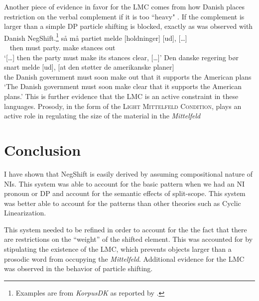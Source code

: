 \documentclass[12pt, letterpaper]{article}
\begin{document}
Another piece of evidence in favor for the LMC comes from how Danish places restriction on the verbal complement if it is too ``heavy" \citep[44f]{mullerDanishHeadDrivenPhraseInpreparation}. If the complement is larger than a simple DP particle shifting is blocked, exactly as was observed with Danish NegShift.\footnote{Examples are from \emph{KorpusDK} as reported by \citet{mullerDanishHeadDrivenPhraseInpreparation}.} 
	\ea \gll {[…]} så må partiet melde [holdninger] [ud], {[…]}\\
	~ then must party.\Def{} make stances out\\
	\glt `{[…]} then the party must make its stances clear, {[…]}'
	\ex \gll Den danske regering bør snart melde [ud], [at den støtter de amerikanske planer]\\
	the Danish government must soon make out that it supports the American plans\\
	\glt `The Danish government must soon make clear that it supports the American plans.'
	\z 
This is further evidence that the LMC is an active constraint in these languages. Prosody, in the form of the \textsc{Light Mittelfeld Condition}, plays an active role in regulating the size of the material in the \emph{Mittelfeld}

\section{Conclusion} \label{sec:CONCLUSION}

I have shown that NegShift is easily derived by assuming  compositional nature of NIs. This system was able to account for the basic pattern when we had an NI pronoun or DP and account for the semantic effects of split-scope. This system was better able to account for the patterns than other theories such as Cyclic Linearization. 

This system needed to be refined in order to account for the the fact that there are restrictions on the ``weight'' of the shifted element. This was accounted for by stipulating the existence of the LMC, which prevents objects larger than a prosodic word from occupying the \emph{Mittelfeld}. Additional evidence for the LMC was observed in the behavior of particle shifting. 


\printbibliography[heading=bibintoc]
\end{document}
